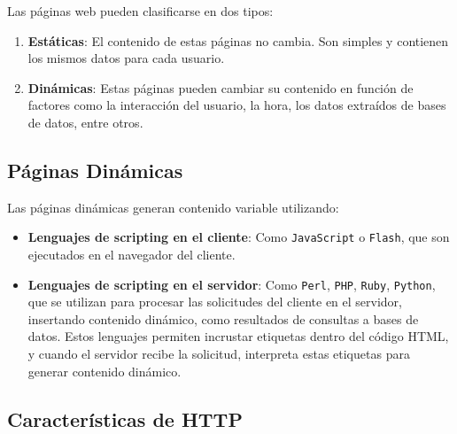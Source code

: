 \documentclass[a4paper,12pt]{article}
\begin{document}
Las páginas web pueden clasificarse en dos tipos:

\begin{enumerate}
    \item \textbf{Estáticas}: El contenido de estas páginas no cambia. Son simples y contienen los mismos datos para cada usuario.
    \item \textbf{Dinámicas}: Estas páginas pueden cambiar su contenido en función de factores como la interacción del usuario, la hora, los datos extraídos de bases de datos, entre otros.
\end{enumerate}

\subsection{Páginas Dinámicas}
Las páginas dinámicas generan contenido variable utilizando:

\begin{itemize}
    \item \textbf{Lenguajes de scripting en el cliente}: Como \texttt{JavaScript} o \texttt{Flash}, que son ejecutados en el navegador del cliente.
    \item \textbf{Lenguajes de scripting en el servidor}: Como \texttt{Perl}, \texttt{PHP}, \texttt{Ruby}, \texttt{Python}, que se utilizan para procesar las solicitudes del cliente en el servidor, insertando contenido dinámico, como resultados de consultas a bases de datos. Estos lenguajes permiten incrustar etiquetas dentro del código HTML, y cuando el servidor recibe la solicitud, interpreta estas etiquetas para generar contenido dinámico.
\end{itemize}

\subsection{Características de HTTP}
\end{document}
